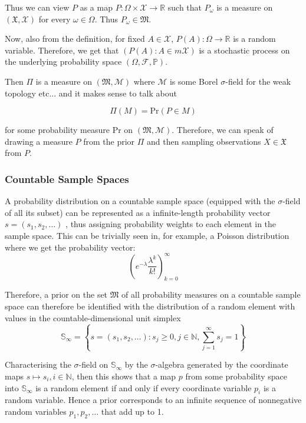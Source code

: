 \documentclass[a4paper,11pt]{article}
\theoremstyle{theorem}
\theoremstyle{definition}
\theoremstyle{remark}
\begin{document}
Thus we can view $P$ as a map $P: \Omega \times \mathcal{X} \to \mathbb{R}$ such that $P_{\omega}$ is a measure on $(\mathfrak{X}, \mathcal{X})$ for every $\omega \in \Omega$. Thus $P_{\omega} \in \mathfrak{M}$.

Now, also from the definition, for fixed $A \in \mathcal{X}$, $P(A) : \Omega \to \mathbb{R}$ is a random variable. Therefore, we get that $(P(A) : A \in m\mathcal{X})$ is a stochastic process on the underlying probability space $(\Omega, \mathcal{F}, \mathbb{P})$.

Then $\Pi$ is a measure on $(\mathfrak{M}, \mathcal{M})$ where $\mathcal{M}$ is some Borel $\sigma$-field for the weak topology etc... and it makes sense to talk about

\[
\Pi(M) = \text{Pr}(P \in M) 
\]

for some probability measure Pr on $(\mathfrak{M}, \mathcal{M})$. Therefore, we can speak of drawing a measure $P$ from the prior $\Pi$ and then sampling observations $X \in \mathfrak{X}$ from $P$.

\subsubsection{Countable Sample Spaces}

A probability distribution on a countable sample space (equipped with the $\sigma$-field of all its subset) can be represented as a infinite-length probability vector $s = (s_1, s_2, \dotsc)$ , thus assigning probability weights to each element in the sample space. This can be trivially seen in, for example, a Poisson distribution where we get the probability vector:
\[
\left(e^{-\lambda}\frac{\lambda^{k}}{k!}\right)_{k=0}^{\infty}
\]

Therefore, a prior on the set $\mathfrak{M}$ of all probability measures on a countable sample space can therefore be identified with the distribution of a random element with values in the countable-dimensional unit simplex
\begin{equation}
\mathbb{S}_{\infty} = \left\lbrace s = (s_1, s_2, \dotsc): s_j \geq 0, j \in \mathbb{N}, \sum_{j=1}^{\infty}{s_j} = 1\right\rbrace
\end{equation}

Characterising the $\sigma$-field on $\mathbb{S}_{\infty}$ by the $\sigma$-algebra generated by the coordinate maps $s \mapsto s_{i}, i \in \mathbb{N}$, then this shows that a map $p$ from some probability space into $\mathbb{S}_{\infty}$ is a random element if and only if every coordinate variable $p_{i}$ is a random variable. Hence a prior corresponds to an infinite sequence of nonnegative random variables $p_1, p_2, \dotsc$ that add up to 1.
\end{document}
